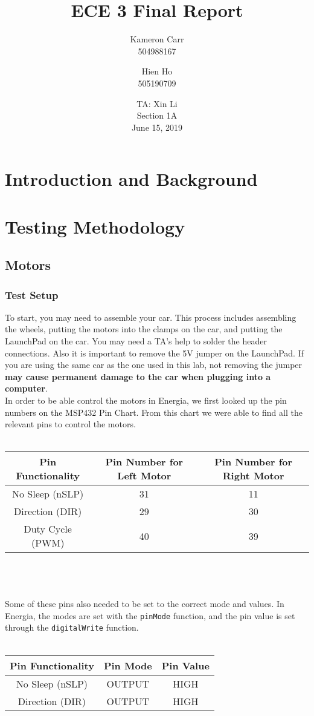 \documentclass[12pt]{article}
\title{ECE 3 Final Report}
\author{Kameron Carr \\ 504988167 \and Hien Ho \\ 505190709}
\date{TA: Xin Li \\ Section 1A \\ June 15, 2019}
\begin{document}
\maketitle

\section{Introduction and Background}

\section{Testing Methodology}
\subsection{Motors}
\subsubsection{Test Setup}
To start, you may need to assemble your car. This process includes assembling the wheels, putting the motors into the clamps on the car, and putting the LaunchPad on the car. You may need a TA's help to solder the header connections. Also it is important to remove the 5V jumper on the LaunchPad. If you are using the same car as the one used in this lab, not removing the jumper \textbf{may cause permanent damage to the car when plugging into a computer}.
\\
In order to be able control the motors in Energia, we first looked up the pin numbers on the MSP432 Pin Chart. From this chart we were able to find all the relevant pins to control the motors.
\\ \\
\begin{tabu}{|c|c|c|}
\hline
\textbf{Pin Functionality} & \textbf{Pin Number for Left Motor} & \textbf{Pin Number for Right Motor} \\ \hline
No Sleep (nSLP) & 31 & 11 \\
Direction (DIR) & 29 & 30 \\
Duty Cycle (PWM) & 40 & 39 \\
\hline
\end{tabu}
\\ \\ \\
Some of these pins also needed to be set to the correct mode and values. In Energia, the modes are set with the \texttt{pinMode} function, and the pin value is set through the \texttt{digitalWrite} function.
\\ \\
\begin{tabu}{|c|c|c|}
\hline
\textbf{Pin Functionality} & \textbf{Pin Mode} & \textbf{Pin Value} \\ \hline
No Sleep (nSLP) & OUTPUT & HIGH \\
Direction (DIR) & OUTPUT & HIGH \\
\hline
\end{tabu} \\ \\
\end{document}
